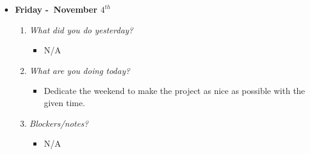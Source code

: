 \begin{itemize}
  \item[] \textbf{\large Friday -\ November \(4^{th}\)}
  \begin{enumerate}
    \item \textsl{What did you do yesterday?}
    \begin{itemize}
      \item N/A
    \end{itemize}
    \item \textsl{What are you doing today?}
    \begin{itemize}
      \item Dedicate the weekend to make the project as nice as possible with the given time.
    \end{itemize}
    \item \textsl{Blockers/notes?}
    \begin{itemize}
      \item N/A
    \end{itemize}
  \end{enumerate}
\end{itemize}


